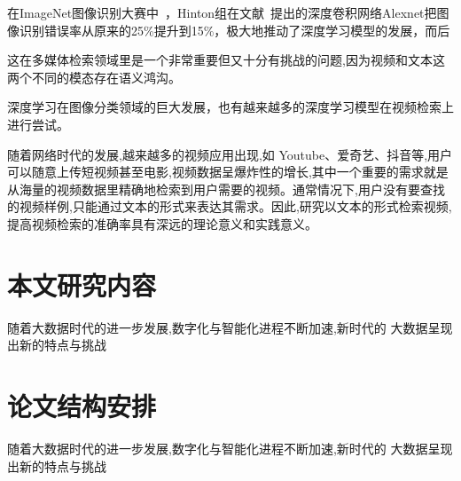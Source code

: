 在ImageNet图像识别大赛中~\cite{deng2009imagenet}，Hinton组在文献~\cite{krizhevsky2012imagenet}提出的深度卷积网络Alexnet把图像识别错误率从原来的25\%提升到15\%，极大地推动了深度学习模型的发展，而后

这在多媒体检索领域里是一个非常重要但又十分有挑战的问题,因为视频和文本这两个不同的模态存在语义鸿沟。

深度学习在图像分类领域的巨大发展，也有越来越多的深度学习模型在视频检索上进行尝试。


随着网络时代的发展,越来越多的视频应用出现,如 Youtube、爱奇艺、抖音等,用户可以随意上传短视频甚至电影,视频数据呈爆炸性的增长,其中一个重要的需求就是从海量的视频数据里精确地检索到用户需要的视频。通常情况下,用户没有要查找的视频样例,只能通过文本的形式来表达其需求。因此,研究以文本的形式检索视频,提高视频检索的准确率具有深远的理论意义和实践意义。


\section{本文研究内容}
随着大数据时代的进一步发展,数字化与智能化进程不断加速,新时代的
大数据呈现出新的特点与挑战
\section{论文结构安排}
随着大数据时代的进一步发展,数字化与智能化进程不断加速,新时代的
大数据呈现出新的特点与挑战

